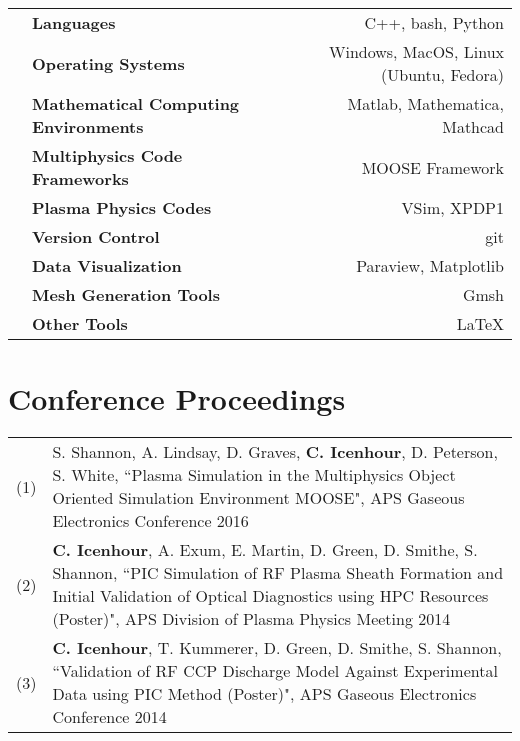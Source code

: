 \documentclass{article}
\begin{document}
	\begin{tabularx}{\textwidth}{l X r}
		\hspace {2em} & \textbf{Languages} & C++, bash, Python \\
					  & \textbf{Operating Systems} & Windows, MacOS, Linux (Ubuntu, Fedora) \\
					  & \textbf{Mathematical Computing Environments} & Matlab, Mathematica, Mathcad \\
					  & \textbf{Multiphysics Code Frameworks} & MOOSE Framework \\
					  & \textbf{Plasma Physics Codes} & VSim, XPDP1 \\
					  & \textbf{Version Control} & git \\
					  & \textbf{Data Visualization} & Paraview, Matplotlib \\
					  & \textbf{Mesh Generation Tools} & Gmsh \\
					  & \textbf{Other Tools} & \LaTeX
	\end{tabularx}

\section*{Conference Proceedings}

	\begin{tabularx}{\textwidth}{l X}
		(1)  &  S. Shannon, A. Lindsay, D. Graves, \textbf{C. Icenhour}, D. Peterson, S. White, ``Plasma Simulation in the Multiphysics Object Oriented Simulation Environment MOOSE", APS Gaseous Electronics Conference 2016 \\
		(2)  &  \textbf{C. Icenhour}, A. Exum, E. Martin, D. Green, D. Smithe, S. Shannon, ``PIC Simulation of RF Plasma Sheath Formation and Initial Validation of Optical Diagnostics using HPC Resources (Poster)", APS Division of Plasma Physics Meeting 2014 \\
		(3)  &  \textbf{C. Icenhour}, T. Kummerer, D. Green, D. Smithe, S. Shannon, ``Validation of RF CCP Discharge Model Against Experimental Data using PIC Method (Poster)", APS Gaseous Electronics Conference 2014
	\end{tabularx}
\end{document}
